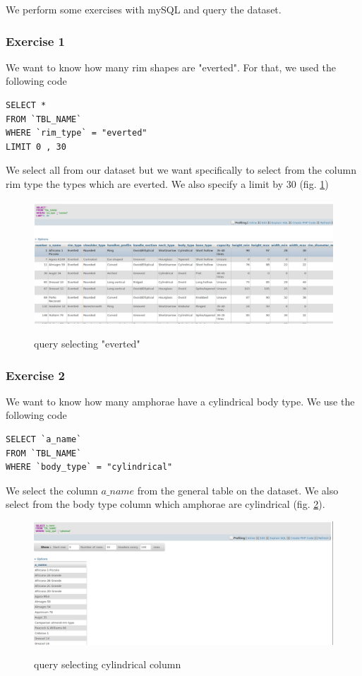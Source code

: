 \documentclass[10pt,a4paper]{article}
\begin{document}
We perform some exercises with mySQL and query the dataset. 

\subsubsection{Exercise 1}

We want to know how many rim shapes are "everted". For that, we used the following code

\begin{verbatim}
SELECT *
FROM `TBL_NAME`
WHERE `rim_type` = "everted"
LIMIT 0 , 30
\end{verbatim}


We select all from our dataset but we want specifically to select from the column rim type the types which are everted. We also specify a limit by 30 (fig. \ref{query1})

\begin{figure}[hdp]
     \centering
\includegraphics[scale=0.30]{output_query1.png}
\label{query1}
\caption{query selecting "everted"}
\end{figure} 



\subsubsection{Exercise 2}

We want to know how many amphorae have a cylindrical body type. We use the following code

\begin{verbatim}
SELECT `a_name`
FROM `TBL_NAME`
WHERE `body_type` = "cylindrical"
\end{verbatim}

We select the column $a\_name$ from the general table on the dataset. We also select from the body type column which amphorae are cylindrical (fig. \ref{query2}). 

\begin{figure}[hdp]
\centering
\includegraphics[scale=0.30]{query2.png}
\label{query2}
\caption{query selecting cylindrical column}
\end{figure} 
\end{document}
